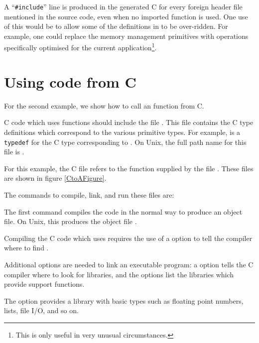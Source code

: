 A ``\verb+#include+'' line is produced in the generated C
for every foreign header file mentioned in
the source code, even when no imported function is used.
One use of this would be to allow
some of the definitions in  to be over-ridden. For
example, one could replace the memory management primitives with
operations specifically optimised for the current
application\footnote{This is only useful in very unusual
circumstances.}.

\section{Using \asharp{} code from C}


For the second example, we show how to call an \asharp{} function from C.

C code which uses \asharp{} functions should include the file
.  This file contains the C type definitions
which correspond to the various \asharp{} primitive types.
For example,  is a {\tt typedef} for the C type corresponding
to .
On Unix, the full path name for this file is
.

For this example, the C file  refers to the function 
supplied by the \asharp{} file .
These files are shown in figure \ref{CtoAFigure}.

The commands to compile, link, and run these files are:

The first command compiles the \asharp{} code in the normal way
to produce an object file.
On Unix, this produces the object file .

Compiling the C code which uses 
requires the use of a  option to tell the compiler where
to find .

Additional options are needed to link an executable program:
a  option tells the C compiler where to look for libraries,
and the  options list the libraries which provide \asharp{}
support functions.

The  option provides a library with basic \asharp{} types
such as floating point numbers, lists, file I/O, and so on.

